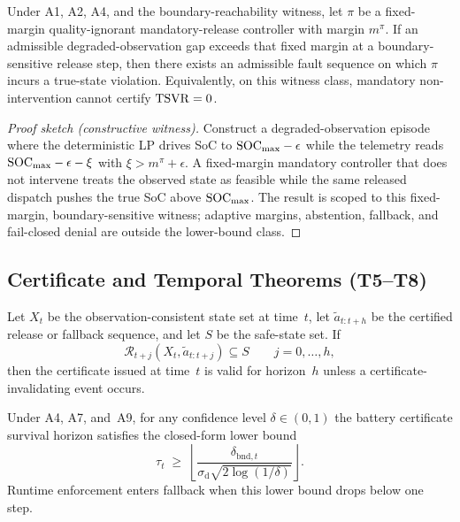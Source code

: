 \begin{theorem}\label{thm:T4}
Under A1, A2, A4, and the boundary-reachability witness, let $\pi$ be a
fixed-margin quality-ignorant mandatory-release controller with margin
$m^\pi$.  If an admissible degraded-observation gap exceeds that fixed margin
at a boundary-sensitive release step, then there exists an admissible fault
sequence on which $\pi$ incurs a true-state violation.  Equivalently, on this
witness class, mandatory non-intervention cannot certify $\mathrm{TSVR}=0$.
\end{theorem}

\begin{proof}[Proof sketch (constructive witness)]
Construct a degraded-observation episode where the deterministic LP drives SoC to
$\mathrm{SOC}_{\max} - \epsilon$ while the telemetry reads $\mathrm{SOC}_{\max} - \epsilon - \xi$
with $\xi>m^\pi+\epsilon$.  A fixed-margin mandatory controller that does not
intervene treats the observed state as feasible while the same released dispatch
pushes the true SoC above $\mathrm{SOC}_{\max}$.  The result is scoped to this
fixed-margin, boundary-sensitive witness; adaptive margins, abstention,
fallback, and fail-closed denial are outside the lower-bound class.
\end{proof}

\subsection{Certificate and Temporal Theorems (T5--T8)}

\begin{theorem}\label{thm:T5}
Let $X_t$ be the observation-consistent state set at time~$t$, let
$\tilde a_{t:t+h}$ be the certified release or fallback sequence, and let
$S$ be the safe-state set.  If
\[
  \mathcal R_{t+j}(X_t,\tilde a_{t:t+j}) \subseteq S
  \qquad j=0,\ldots,h,
\]
then the certificate issued at time~$t$ is valid for horizon~$h$ unless a
certificate-invalidating event occurs.
\end{theorem}

\begin{proposition}\label{thm:T6}
Under A4, A7, and~A9, for any confidence level $\delta \in (0,1)$ the battery
certificate survival horizon satisfies the closed-form lower bound
\[
  \tau_t \;\ge\;
  \left\lfloor
    \frac{\delta_{\mathrm{bnd},t}}
    {\sigma_{\mathrm{d}}\sqrt{2\log(1/\delta)}}
  \right\rfloor.
\]
Runtime enforcement enters fallback when this lower bound drops below one step.
\end{proposition}


